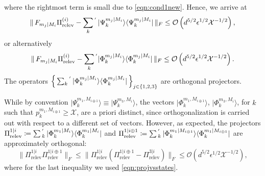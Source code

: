 where the rightmost term is small due to \ref{eqn:cond1new}. Hence, we arrive at
\begin{equation*}
\|\thinspace F_{m_j\vert M_i}\Pi_{\text{relev}}^{(i)}-\sum_{k}{}^{'}\thinspace\vert \Psi_k^{m_j\vert M_i}\rangle \langle \Psi_k^{m_j\vert M_i}\vert \thinspace\|_F \leq \mathcal{O}\left(d^{5/2}\epsilon^{1/2}\mathcal{X}^{-1/2}\right),
\end{equation*}
or alternatively
\begin{equation}
\label{eqn:projresult}
\|\thinspace F_{m_j\vert M_i}\Pi_{\text{relev}}^{(i)}-\sum_{k}{}^{'}\vert \Phi_k^{m_j\vert M_i}\rangle \langle \Phi_k^{m_j\vert M_i}\vert \thinspace\|_F \leq \mathcal{O}\left(d^{5/2}\epsilon^{1/2}\mathcal{X}^{-1/2}\right).
\end{equation}
The operators $\left\{\thinspace\sum_{k}{}^{'}\thinspace\vert \Phi_k^{m_j\vert M_i}\rangle \langle \Phi_k^{m_j\vert M_i}\vert\thinspace\right\}_{j\in\{1,2,3\}}$ are orthogonal projectors.

While by convention $\vert \Psi_k^{m_1,M_{i\oplus 1}}\rangle \equiv \vert \Psi_k^{m_3,M_i}\rangle$, the vectors $\vert \Phi_k^{m_1,M_{i\oplus 1}}\rangle$, $\vert \Phi_k^{m_3,M_i}\rangle$, for $k$ such that $p_k^{m_1,M_{i\oplus 1}}\geq \mathcal{X}$, are a priori distinct, since orthogonalization is carried out with respect to a different set of vectors. However, as expected, the projectors $\Pi_{\text{relev}}^{1\vert i}\coloneqq \sum{}^{'}_k\thinspace \vert \Phi_k^{m_1\vert M_i}\rangle \langle \Phi_k^{m_1\vert M_i} \vert $ and $\Pi_{\text{relev}}^{1\vert i\oplus 1}\coloneqq \sum{}^{'}_k\thinspace \vert \Phi_k^{m_1\vert M_{i\oplus 1}}\rangle \langle \Phi_k^{m_1\vert M_{i\oplus 1}} \vert$ are approximately orthogonal:
\begin{equation}
\label{eqn:approxorth}
\|\Pi_{\text{relev}}^{1\vert i} \Pi_{\text{relev}}^{1\vert i\oplus 1}\|_F \leq \|\Pi_{\text{relev}}^{1\vert i}(\Pi_{\text{relev}}^{1\vert i\oplus 1}-\Pi_{\text{relev}}^{3\vert i})\|_F\leq \mathcal{O}(d^{5/2}\epsilon^{1/2}\mathcal{X}^{-1/2}),
\end{equation}
where for the last inequality we used \ref{eqn:projvsstates}.
